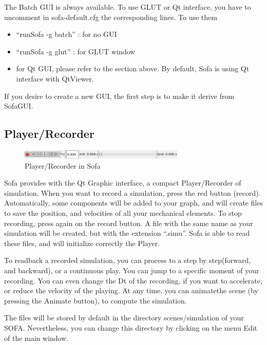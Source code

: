 The Batch GUI is always available. To use GLUT or Qt interface, you have to uncomment in sofa-default.cfg the corresponding lines. To use them
\begin{itemize}
 \item ``runSofa -g batch'' : for no GUI
 \item ``runSofa -g glut'' : for GLUT window 
 \item for Qt GUI, please refer to the section above. By default, Sofa is using Qt interface with QtViewer.
\end{itemize}
If you desire to create a new GUI, the first step is to make it derive from SofaGUI. 






\subsection{Player/Recorder}

\begin{figure}[htpb]
	\centering
		\includegraphics[width=0.7\textwidth]{GUI/GUI_recorder.png}
	\caption{Player/Recorder in Sofa} 	
\end{figure}
Sofa provides with the Qt Graphic interface, a compact Player/Recorder of simulation. When you want to record a simulation, press the red button (record). Automatically, some components will be added to your graph, and will create files to save the position, and velocities of all your mechanical elements. To stop recording, press again on the record button. A file with the same name as your simulation will be created, but with the extension ``.simu''. Sofa is able to read these files, and will initialize correctly the Player. 
\par
To readback a recorded simulation, you can process to a step by step(forward, and backward), or a continuous play. You can jump to a specific moment of your recording. You can even change the Dt of the recording, if you want to accelerate, or reduce the velocity of the playing. At any time, you can animatethe scene (by pressing the Animate button), to compute the simulation. 
\par
The files will be stored by default in the directory scenes/simulation of your SOFA. Nevertheless, you can change this directory by clicking on the menu Edit of the main window.







